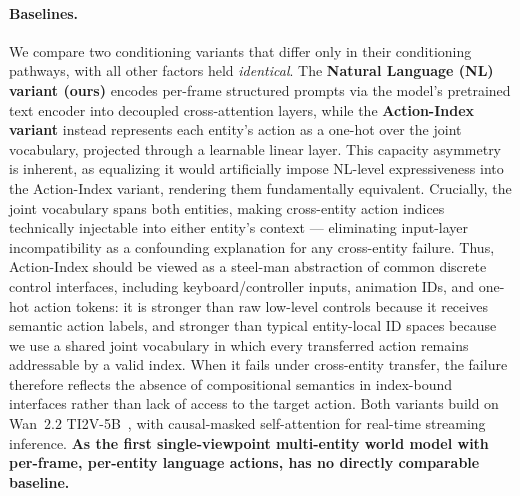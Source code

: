 \paragraph{Baselines.}
We compare two conditioning variants that differ only in their conditioning pathways, with all other factors held \textit{identical}. The \textbf{Natural Language (NL) variant (ours)} encodes per-frame structured prompts via the model's pretrained text encoder into decoupled cross-attention layers, while the \textbf{Action-Index variant} instead represents each entity's action as a one-hot over the joint vocabulary, projected through a learnable linear layer. This capacity asymmetry is inherent, as equalizing it would artificially impose NL-level expressiveness into the Action-Index variant, rendering them fundamentally equivalent. Crucially, the joint vocabulary spans both entities, making cross-entity action indices technically injectable into either entity's context --- eliminating input-layer incompatibility as a confounding explanation for any cross-entity failure.  Thus, Action-Index should be viewed as a steel-man abstraction of common discrete control interfaces, including keyboard/controller inputs, animation IDs, and one-hot action tokens: it is stronger than raw low-level controls because it receives semantic action labels, and stronger than typical entity-local ID spaces because we use a shared joint vocabulary in which every transferred action remains addressable by a valid index. When it fails under cross-entity transfer, the failure therefore reflects the absence of compositional semantics in index-bound interfaces rather than lack of access to the target action. Both variants build on Wan~$2.2$ TI2V-5B~\citep{wang2025wan}, with causal-masked self-attention for real-time streaming inference. \textbf{As the first single-viewpoint multi-entity world model with per-frame, per-entity language actions, \methodname has no directly comparable baseline.}
